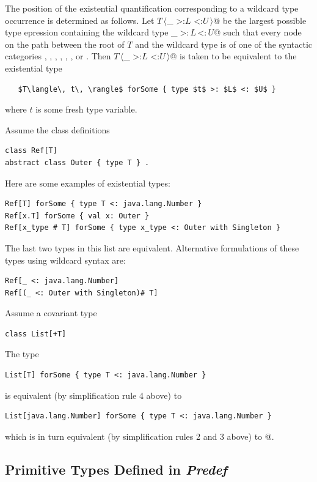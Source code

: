 The position of the existential quantification corresponding to a wildcard type occurrence
is determined as follows. 
Let \lstinline@$T\,\langle$_ >:$L$ <:$U\,\rangle$@ be the largest
possible type epression 
containing the wildcard type \lstinline@_$\;$>:$\,L\,$<:$\,U$@ such that
every node on the path between the root of $T$ and the wildcard type is of one of the syntactic
categories
, , , , ,
, or . Then \lstinline@$T\,\langle$_ >:$L$ <:$U\,\rangle$@ 
is taken to be equivalent to the existential type
\begin{lstlisting}
   $T\langle\, t\, \rangle$ forSome { type $t$ >: $L$ <: $U$ }
\end{lstlisting}
where $t$ is some fresh type variable. 

\example Assume the class definitions
\begin{lstlisting}
class Ref[T]
abstract class Outer { type T } .
\end{lstlisting}
Here are some examples of existential types:
\begin{lstlisting}
Ref[T] forSome { type T <: java.lang.Number }
Ref[x.T] forSome { val x: Outer }
Ref[x_type # T] forSome { type x_type <: Outer with Singleton }
\end{lstlisting}
The last two types in this list are equivalent.
Alternative formulations of these types using wildcard syntax are:
\begin{lstlisting}
Ref[_ <: java.lang.Number]
Ref[(_ <: Outer with Singleton)# T]
\end{lstlisting}

\example Assume a covariant type
\begin{lstlisting}
class List[+T]
\end{lstlisting}
The type
\begin{lstlisting}
List[T] forSome { type T <: java.lang.Number }
\end{lstlisting}
is equivalent (by simplification rule 4 above) to
\begin{lstlisting}
List[java.lang.Number] forSome { type T <: java.lang.Number }
\end{lstlisting}
which is in turn equivalent (by simplification rules 2 and 3 above) to
@.

\subsection{Primitive Types Defined in {\em Predef}}

